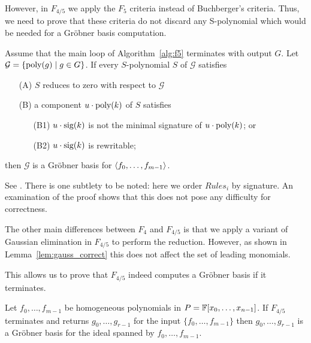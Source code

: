 However, in $F_{4/5}$ we apply the $F_5$ criteria instead of Buchberger's criteria. Thus, we need to prove that these criteria do not discard any S-polynomial which would be needed for a Gröbner basis computation.

\begin{lemma}[\cite{F5C}]
\label{lem:criteria_correct}
Assume that the main loop of Algorithm~\ref{alg:f5} terminates with output $G$. Let $\mathcal{G} = \{\textnormal{poly}(g) \mid g \in G\}$. If every $S$-polynomial $S$ of $\mathcal{G}$ satisfies
\begin{itemize}
 \item[(A)] $S$ reduces to zero with respect to $\mathcal{G}$\;
 \item[(B)] a component $u\cdot\textnormal{poly}(k)$ of $S$ satisfies
 \begin{itemize}
   \item[(B1)] $u\cdot\textnormal{sig}(k)$ is not the minimal signature of $u\cdot\textnormal{poly}(k)$; or
   \item[(B2)] $u\cdot\textnormal{sig}(k)$ is rewritable;
 \end{itemize}
\end{itemize}
then $\mathcal{G}$ is a Gröbner basis for $\langle {f_0,\dots,f_{m-1}} \rangle$.
\end{lemma}

\begin{citeproof}
See \cite{F5C}.
There is one subtlety to be noted: here we order $Rules_i$ by signature.
An examination of the proof shows that this does not pose any difficulty for correctness.
\end{citeproof}


The other main differences between $F_4$ and $F_{4/5}$ is that we apply a variant of Gaussian elimination in $F_{4/5}$ to perform the reduction. However, as shown in Lemma~\ref{lem:gauss_correct} this does not affect the set of leading monomials.

This allows us to prove that $F_{4/5}$ indeed computes a Gröbner basis if it terminates.

\begin{theorem}
\label{theorem:f45-correct}
Let $f_0,\dots,f_{m-1}$ be homogeneous polynomials in $P = \mathbb{F}[x_0,\dots,x_{n-1}]$. If $F_{4/5}$ terminates and returns $g_0,\dots,g_{r-1}$ for the input $\{f_0,\dots,f_{m-1}\}$ then $g_0,\dots,g_{r-1}$ is a Gröbner basis for the ideal spanned by $f_0,\dots,f_{m-1}$.
\end{theorem}

